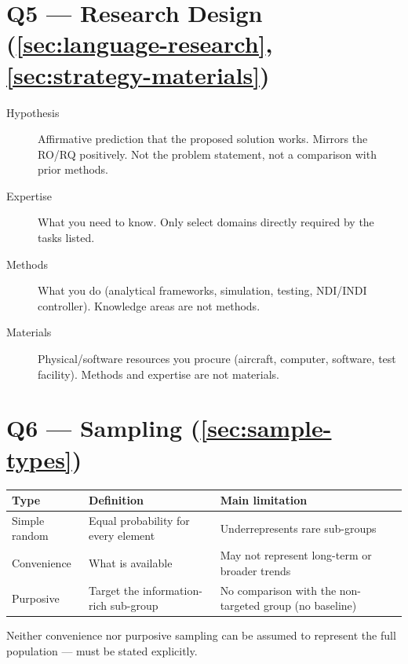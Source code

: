 \documentclass[../main.tex]{subfiles}
\begin{document}
\section*{Q5 — Research Design (\autoref{sec:language-research}, \autoref{sec:strategy-materials})}

\begin{description}
  \item[Hypothesis] Affirmative prediction that the proposed solution works. Mirrors the RO/RQ positively. Not the problem statement, not a comparison with prior methods.
  \item[Expertise] What you need to know. Only select domains directly required by the tasks listed.
  \item[Methods] What you do (analytical frameworks, simulation, testing, NDI/INDI controller). Knowledge areas are not methods.
  \item[Materials] Physical/software resources you procure (aircraft, computer, software, test facility). Methods and expertise are not materials.
\end{description}

\section*{Q6 — Sampling (\autoref{sec:sample-types})}

\begin{center}
\begin{tabular}{@{}p{2.4cm}p{5.2cm}p{7.4cm}@{}}
  \toprule
  \textbf{Type} & \textbf{Definition} & \textbf{Main limitation} \\
  \midrule
  Simple random & Equal probability for every element & Underrepresents rare sub-groups \\[3pt]
  Convenience   & What is available & May not represent long-term or broader trends \\[3pt]
  Purposive     & Target the information-rich sub-group & No comparison with the non-targeted group (no baseline) \\
  \bottomrule
\end{tabular}
\end{center}

Neither convenience nor purposive sampling can be assumed to represent the full population — must be stated explicitly.

\end{document}
